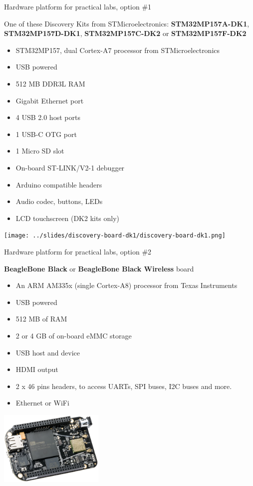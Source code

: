 \documentclass[a4paper,12pt,obeyspaces,spaces,hyphens]{article}
\begin{document}
\feshowtitle

\feshowinfo

\feagendatwocolumn
{Hardware platform for practical labs, option \#1}
{
  One of these Discovery Kits from STMicroelectronics: {\bf
  STM32MP157A-DK1}, {\bf STM32MP157D-DK1}, {\bf STM32MP157C-DK2} or
  {\bf STM32MP157F-DK2}
  \begin{itemize}
  \item STM32MP157, dual Cortex-A7 processor from STMicroelectronics
  \item USB powered
  \item 512 MB DDR3L RAM
  \item Gigabit Ethernet port
  \item 4 USB 2.0 host ports
  \item 1 USB-C OTG port
  \item 1 Micro SD slot
  \item On-board ST-LINK/V2-1 debugger
  \item Arduino compatible headers
  \item Audio codec, buttons, LEDs
  \item LCD touchscreen (DK2 kits only)
  \end{itemize}
}
{}
{
  \begin{center}
    \texttt{[image: ../slides/discovery-board-dk1/discovery-board-dk1.png]}
  \end{center}
}

\feagendatwocolumn
{Hardware platform for practical labs, option \#2}
{
  {\bf BeagleBone Black} or {\bf BeagleBone Black Wireless} board
  \begin{itemize}
  \item An ARM AM335x (single Cortex-A8) processor from Texas
    Instruments
  \item USB powered
  \item 512 MB of RAM
  \item 2 or 4 GB of on-board eMMC storage
  \item USB host and device
  \item HDMI output
  \item 2 x 46 pins headers, to access UARTs, SPI buses, I2C buses
    and more.
  \item Ethernet or WiFi
  \end{itemize}
}
{}
{
  \begin{center}
    \includegraphics[width=5cm]{../slides/beagleboneblack-board/beagleboneblack.png}
  \end{center}
}
\end{document}
